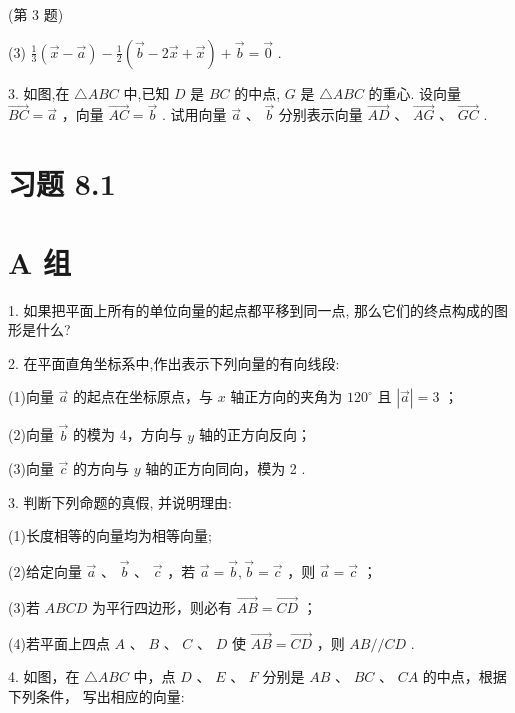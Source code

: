 \documentclass[10pt]{article}
\begin{document}
(第 3 题)

(3) \(\frac{1}{3}\left( {\overrightarrow{x} - \overrightarrow{a}}\right)  - \frac{1}{2}\left( {\overrightarrow{b} - 2\overrightarrow{x} + \overrightarrow{x}}\right)  + \overrightarrow{b} = \overrightarrow{0}\) .

3. 如图,在 \(\bigtriangleup {ABC}\) 中,已知 \(D\) 是 \({BC}\) 的中点, \(G\) 是 \(\bigtriangleup {ABC}\) 的重心. 设向量 \(\overrightarrow{BC} = \overrightarrow{a}\) ，向量 \(\overrightarrow{AC} = \overrightarrow{b}\) . 试用向量 \(\overrightarrow{a}\) 、 \(\overrightarrow{b}\) 分别表示向量 \(\overrightarrow{AD}\text{ 、 }\overrightarrow{AG}\text{ 、 }\overrightarrow{GC}\) .

\section*{习题 8.1}

\section*{A 组}

1. 如果把平面上所有的单位向量的起点都平移到同一点, 那么它们的终点构成的图形是什么?

2. 在平面直角坐标系中,作出表示下列向量的有向线段:

(1)向量 \(\overrightarrow{a}\) 的起点在坐标原点，与 \(x\) 轴正方向的夹角为 \({120}^{ \circ  }\) 且 \(\left| \overrightarrow{a}\right|  = 3\) ；

(2)向量 \(\overrightarrow{b}\) 的模为 4，方向与 \(y\) 轴的正方向反向；

(3)向量 \(\overrightarrow{c}\) 的方向与 \(y\) 轴的正方向同向，模为 2 .

3. 判断下列命题的真假, 并说明理由:

(1)长度相等的向量均为相等向量;

(2)给定向量 \(\overrightarrow{a}\text{ 、 }\overrightarrow{b}\text{ 、 }\overrightarrow{c}\) ，若 \(\overrightarrow{a} = \overrightarrow{b},\overrightarrow{b} = \overrightarrow{c}\) ，则 \(\overrightarrow{a} = \overrightarrow{c}\) ；

(3)若 \({ABCD}\) 为平行四边形，则必有 \(\overrightarrow{AB} = \overrightarrow{CD}\) ；

(4)若平面上四点 \(A\) 、 \(B\) 、 \(C\) 、 \(D\) 使 \(\overrightarrow{AB} = \overrightarrow{CD}\) ，则 \({AB}//{CD}\) .

4. 如图，在 \(\bigtriangleup  {ABC}\) 中，点 \(D\) 、 \(E\) 、 \(F\) 分别是 \({AB}\) 、 \({BC}\) 、 \({CA}\) 的中点，根据下列条件， 写出相应的向量:
\end{document}
